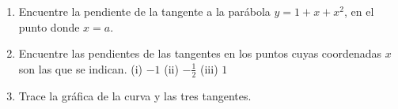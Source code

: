 \item 
    \begin{enumerate}
        \item Encuentre la pendiente de la tangente a la parábola $y = 1 + x + x^2$, en el punto donde $x = a$.
        \item Encuentre las pendientes de las tangentes en los puntos cuyas coordenadas $x$ son las que se indican.
        (i) $-1$ \quad (ii) $-\frac{1}{2}$ \quad (iii) $1$
        \item Trace la gráfica de la curva y las tres tangentes.
    \end{enumerate}
